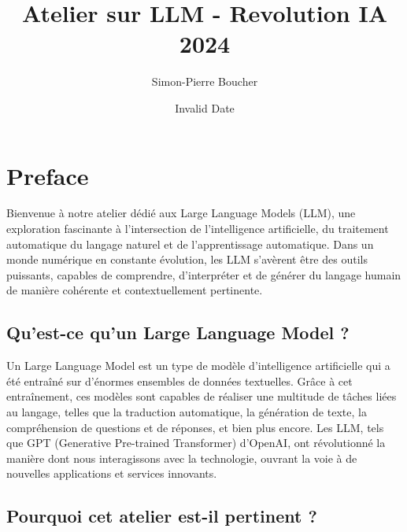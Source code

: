\documentclass[
  letterpaper,
  DIV=11,
  numbers=noendperiod]{scrreprt}
\title{Atelier sur LLM - Revolution IA 2024}
\author{Simon-Pierre Boucher}
\date{Invalid Date}
\renewcommand*\contentsname{Table of contents}
\newcommand\contentsname{Table of contents}
\begin{document}
\maketitle

\renewcommand*\contentsname{Table of contents}
{
\hypersetup{linkcolor=}
\setcounter{tocdepth}{2}
\tableofcontents
}

\chapter*{Preface}\label{preface}


Bienvenue à notre atelier dédié aux Large Language Models (LLM), une
exploration fascinante à l'intersection de l'intelligence artificielle,
du traitement automatique du langage naturel et de l'apprentissage
automatique. Dans un monde numérique en constante évolution, les LLM
s'avèrent être des outils puissants, capables de comprendre,
d'interpréter et de générer du langage humain de manière cohérente et
contextuellement pertinente.

\section*{Qu'est-ce qu'un Large Language Model
?}\label{quest-ce-quun-large-language-model}


Un Large Language Model est un type de modèle d'intelligence
artificielle qui a été entraîné sur d'énormes ensembles de données
textuelles. Grâce à cet entraînement, ces modèles sont capables de
réaliser une multitude de tâches liées au langage, telles que la
traduction automatique, la génération de texte, la compréhension de
questions et de réponses, et bien plus encore. Les LLM, tels que GPT
(Generative Pre-trained Transformer) d'OpenAI, ont révolutionné la
manière dont nous interagissons avec la technologie, ouvrant la voie à
de nouvelles applications et services innovants.

\section*{Pourquoi cet atelier est-il pertinent
?}\label{pourquoi-cet-atelier-est-il-pertinent}
\end{document}
